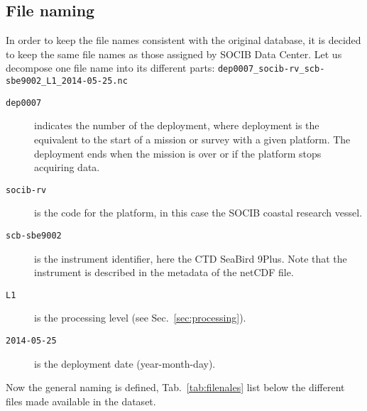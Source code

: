 \documentclass[essd,manuscript]{copernicus}
\begin{document}
\subsection{File naming}
In order to keep the file names consistent with the original database, it is decided to keep the same file names as those assigned by SOCIB Data Center. Let us decompose one file name into its different parts: 
\texttt{dep0007\_socib-rv\_scb-sbe9002\_L1\_2014-05-25.nc}
\begin{description}
\item[\tt dep0007] indicates the number of the deployment, where deployment is the equivalent to the start of a mission or survey with a given platform. The deployment ends when the mission is over or if the platform stops acquiring data.
\item[\tt socib-rv] is the code for the platform, in this case the SOCIB coastal research vessel.
\item[\tt scb-sbe9002] is the instrument identifier, here the CTD SeaBird 9Plus. Note that the instrument is described in the metadata of the netCDF file.
\item[\tt L1] is the processing level (see Sec.~\ref{sec:processing}).
\item[\tt 2014-05-25] is the deployment date (year-month-day).
\end{description}
Now the general naming is defined, Tab.~\ref{tab:filenales} list below the different files made available in the dataset.
\end{document}
